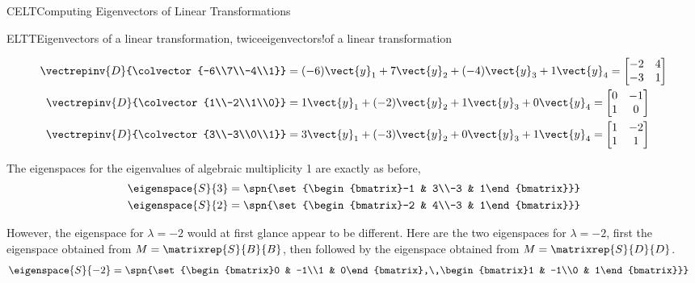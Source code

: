 \begin{subsect}{CELT}{Computing Eigenvectors of Linear Transformations}
\begin{example}{ELTT}{Eigenvectors of a linear transformation, twice}{eigenvectors!of a linear transformation}
\begin{para}
\begin{align*}
%
\vectrepinv{D}{\colvector{-6\\7\\-4\\1}}
&=
(-6)\vect{y}_1+7\vect{y}_2+(-4)\vect{y}_3+1\vect{y}_4=
\begin{bmatrix}-2 & 4\\-3 & 1\end{bmatrix}\\
%
\vectrepinv{D}{\colvector{1\\-2\\1\\0}}
&=
1\vect{y}_1+(-2)\vect{y}_2+1\vect{y}_3+0\vect{y}_4=
\begin{bmatrix}0 & -1\\1 & 0\end{bmatrix}\\
%
\vectrepinv{D}{\colvector{3\\-3\\0\\1}}
&=
3\vect{y}_1+(-3)\vect{y}_2+0\vect{y}_3+1\vect{y}_4=
\begin{bmatrix}1 & -2\\1 & 1\end{bmatrix}\\
%
\end{align*}
\end{para}
%
\begin{para}The eigenspaces for the eigenvalues of algebraic multiplicity 1 are exactly as before,
%
\begin{align*}
\eigenspace{S}{3}&=
\spn{\set{\begin{bmatrix}-1 & 3\\-3 & 1\end{bmatrix}}}\\
%
\eigenspace{S}{2}&=
\spn{\set{\begin{bmatrix}-2 & 4\\-3 & 1\end{bmatrix}}}
\end{align*}
\end{para}
%
\begin{para}However, the eigenspace for $\lambda=-2$ would at first glance appear to be different.  Here are the two eigenspaces for $\lambda=-2$, first the eigenspace obtained from $M=\matrixrep{S}{B}{B}$, then followed by the eigenspace obtained from $M=\matrixrep{S}{D}{D}$.
%
\begin{align*}
%
\eigenspace{S}{-2}&=
\spn{\set{\begin{bmatrix}0 & -1\\1 & 0\end{bmatrix},\,\begin{bmatrix}1 & -1\\0 & 1\end{bmatrix}}}

\end{align*}
\end{para}
\end{example}
\end{subsect}
